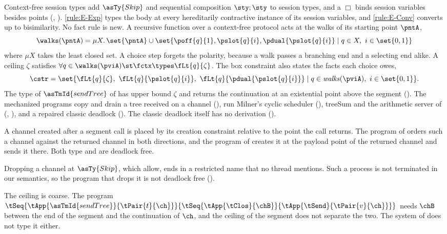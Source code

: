 Context-free session types add $\asTy{Skip}$ and sequential composition
$\sty;\sty$ to session types, and a $\Box$ binds session variables
besides points (, ). \ref{rule:E-Exp} types the body
at every hereditarily contractive instance of its session variables, and
\ref{rule:E-Conv} converts up to bisimilarity. No fact rule is new.
A recursive function over a context-free protocol acts at the walks of
its starting point $\pntA$,
\[
  \walks(\pntA)=\mu X.\,\set{\pntA}\cup
    \set{\poff{q}{1},\pslot{q}{i},\pdual{\pslot{q}{i}}\mid q\in X,\ i \in \set{0,1}}
\]
where $\mu X$ takes the least closed set. A choice step forgets the
polarity, because a walk passes a branching end and a selecting end
alike. A ceiling $\zeta$ satisfies
$\forall q\in\walks(\pviA)\st\fctx\types\fLt{q}{\zeta}$.
The box constraint also states the facts each choice owes,
\[
  \cstr = \set{\fLt{q}{\zeta},\ \fLt{q}{\pslot{q}{i}},\ \fLt{q}{\pdual{\pslot{q}{i}}}
    \mid q \in \mathit{walks}(\pviA),\ i \in \set{0,1}} .
\]
The type of $\asTmId{sendTree}$ of \citet{ThiemannV16} has upper bound
$\zeta$ and returns the continuation at an existential point above the
segment (). The mechanized programs copy and drain a
tree received on a channel (), run Milner's
cyclic scheduler (), treeSum and the arithmetic
server of \citet{ThiemannV16} (,
), and a repaired classic deadlock
(). The classic deadlock itself has no
derivation ().

A channel created after a segment call is placed by its creation
constraint relative to the point the call returns. The program of
 orders such a channel against the returned
channel in both directions, and the program of 
creates it at the payload point of the returned channel and sends it
there. Both type and are deadlock free.

Dropping a channel at $\asTy{Skip}$, which \citet{MordidoP} allow, ends
in a restricted name that no thread mentions. Such a process is not
terminated in our semantics, so the program that drops it is not deadlock
free ().

The ceiling is coarse. The program
$\tSeq{\tApp{\asTmId{sendTree}}{\tPair{t}{\ch}}}{\tSeq{\tApp{\tClos}{\chB}}{\tApp{\tSend}{\tPair{v}{\ch}}}}$
needs $\chB$ between the end of the segment and the continuation of
$\ch$, and the ceiling of the segment does not separate the two. The
system of \citet{MordidoP} does not type it either.

